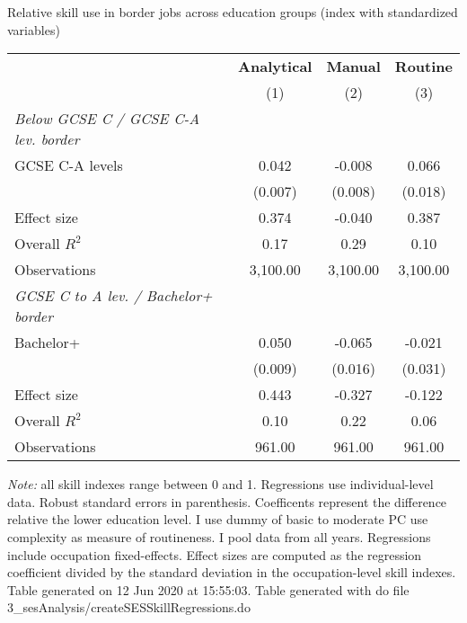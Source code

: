 \begin{center}
\begin{threeparttable}[!h]
\caption{Relative skill use in border jobs across education groups (index with standardized variables)}
\label{tab:skillRegs}
\begin{tabular}{lccc}
\toprule
\toprule
&\multicolumn{1}{c}{\textbf{Analytical}}&\multicolumn{1}{c}{\textbf{Manual}}&\multicolumn{1}{c}{\textbf{Routine}} \\
\textbf{}&\multicolumn{1}{c}{(1)}&\multicolumn{1}{c}{(2)}&\multicolumn{1}{c}{(3)} \\
\midrule
\midrule\textit{Below GCSE C / GCSE C-A lev. border}\vspace{1mm} \\ 
\hspace{3mm}GCSE C-A levels&       0.042\sym{***}&      -0.008         &       0.066\sym{***}\\
                    &     (0.007)         &     (0.008)         &     (0.018)         \\
\hspace{3mm}Effect size&       0.374         &      -0.040         &       0.387         \\
\midrule Overall $ R^2$&        0.17         &        0.29         &        0.10         \\
Observations        &    3,100.00         &    3,100.00         &    3,100.00         \\
\midrule\textit{GCSE C to A lev. / Bachelor+ border}\vspace{1mm} \\ 
\hspace{3mm}Bachelor+&       0.050\sym{***}&      -0.065\sym{***}&      -0.021         \\
                    &     (0.009)         &     (0.016)         &     (0.031)         \\
\hspace{3mm}Effect size&       0.443         &      -0.327         &      -0.122         \\
\midrule Overall $ R^2$&        0.10         &        0.22         &        0.06         \\
Observations        &      961.00         &      961.00         &      961.00         \\
\bottomrule
\bottomrule
\end{tabular}
\begin{tablenotes}
\item \footnotesize \textit{Note:} all skill indexes range between 0 and 1. Regressions use individual-level data. Robust standard errors in parenthesis. Coefficents represent the difference relative the lower education level. I use dummy of basic to moderate PC use complexity as measure of routineness. I pool data from all years. Regressions include occupation fixed-effects. Effect sizes are computed as the regression coefficient divided by the standard deviation in the occupation-level skill indexes. Table generated on 12 Jun 2020 at 15:55:03. Table generated with do file 3\_sesAnalysis/createSESSkillRegressions.do
\end{tablenotes}
\end{threeparttable}
\end{center}
